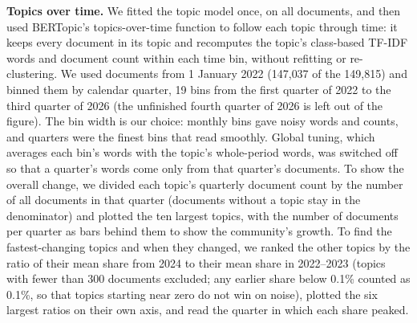 {\textbf{Topics over time.} We fitted the topic model once, on all documents, and then used BERTopic's topics-over-time function \cite{grootendorst2022bertopic} to follow each topic through time: it keeps every document in its topic and recomputes the topic's class-based TF-IDF words and document count within each time bin, without refitting or re-clustering. We used documents from 1 January 2022 (147{,}037 of the 149{,}815) and binned them by calendar quarter, 19 bins from the first quarter of 2022 to the third quarter of 2026 (the unfinished fourth quarter of 2026 is left out of the figure). The bin width is our choice: monthly bins gave noisy words and counts, and quarters were the finest bins that read smoothly. Global tuning, which averages each bin's words with the topic's whole-period words, was switched off so that a quarter's words come only from that quarter's documents. To show the overall change, we divided each topic's quarterly document count by the number of all documents in that quarter (documents without a topic stay in the denominator) and plotted the ten largest topics, with the number of documents per quarter as bars behind them to show the community's growth. To find the fastest-changing topics and when they changed, we ranked the other topics by the ratio of their mean share from 2024 to their mean share in 2022--2023 (topics with fewer than 300 documents excluded; any earlier share below 0.1\% counted as 0.1\%, so that topics starting near zero do not win on noise), plotted the six largest ratios on their own axis, and read the quarter in which each share peaked.\\
}
